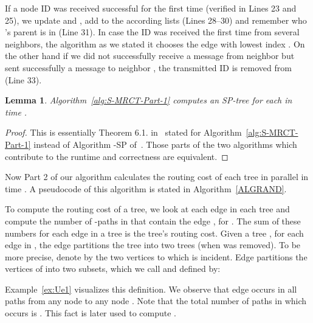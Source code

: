 \documentclass[11pt]{article}
\newtheorem{lemma}[theorem]{Lemma}
\begin{document}
If a node ID  was received successful for the first time (verified in Lines 23 and 25), we update  and , add  to the according lists (Lines 28--30) and remember who 's parent is in  (Line 31). In case the ID  was received the first time from several neighbors, the algorithm as we stated it chooses the edge with lowest index . On the other hand if we did not successfully receive a message from neighbor  but sent successfully a message to neighbor , the transmitted ID is removed from  (Line 33).
\begin{lemma}\label{lem:S-MRCT-Part-1-Runtime}
Algorithm~\ref{alg:S-MRCT-Part-1} computes an SP-tree  for each  in time .
\end{lemma}
\begin{proof}
This is essentially Theorem 6.1. in~\cite{holzer2012optimal-merge} stated for Algorithm~\ref{alg:S-MRCT-Part-1} instead of Algorithm -SP of~\cite{holzer2012optimal-merge}. Those parts of the two algorithms which contribute to the runtime and correctness are equivalent. 
\end{proof}


Now Part 2 of our algorithm calculates the routing cost of each tree  in parallel in time .
A pseudocode of this algorithm is stated in  Algorithm~\ref{ALGRAND}.


To compute the routing cost of a tree, we look at each edge  in each tree  and compute the number of -paths in  that contain the edge , for . The sum of these numbers for each edge in a tree is the tree's routing cost. Given a tree , for each edge  in , the edge partitions the tree into two trees (when  was removed). To be more precise, denote by  the two vertices to which  is incident. Edge  partitions the vertices of  into two subsets, which we call  and  defined by: 

Example~\ref{ex:Ue1} visualizes this definition. 
We observe that edge  occurs in all  paths from any node  to any node . Note that the total number of paths in which  occurs is . This fact is later used to compute . 
\end{document}
